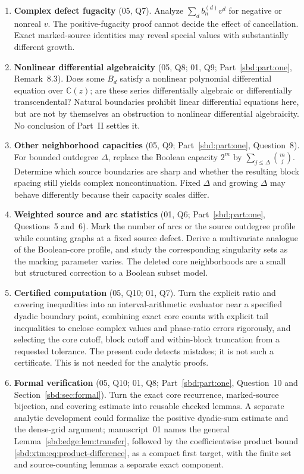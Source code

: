 \documentclass[11pt,a4paper]{article}
\theoremstyle{definition}
\newcommand{\C}{\mathbb C}
\begin{document}
\begin{enumerate}[label=\textbf{\arabic*.},leftmargin=*]
\item \textbf{Complex defect fugacity} (05, Q7). Analyze
$\sum_db_n^{(d)}v^d$ for negative or nonreal $v$. The positive-fugacity
proof cannot decide the effect of cancellation. Exact marked-source
identities may reveal special values with substantially different growth.

\item \textbf{Nonlinear differential algebraicity} (05, Q8; 01, Q9;
Part~\ref{sbd:part:one}, Remark~8.3). Does some $B_d$ satisfy a nonlinear
polynomial differential equation over $\C(z)$; are these series
differentially algebraic or differentially transcendental? Natural
boundaries prohibit linear differential equations here, but are not by
themselves an obstruction to nonlinear differential algebraicity. No
conclusion of Part~II settles it.

\item \textbf{Other neighborhood capacities} (05, Q9;
Part~\ref{sbd:part:one}, Question~8). For bounded outdegree $\Delta$,
replace the Boolean capacity $2^m$ by $\sum_{j\le\Delta}\binom mj$.
Determine which source boundaries are sharp and whether the resulting block
spacing still yields complex noncontinuation. Fixed $\Delta$ and growing
$\Delta$ may behave differently because their capacity scales differ.

\item \textbf{Weighted source and arc statistics} (01, Q6;
Part~\ref{sbd:part:one}, Questions~5 and~6). Mark the number of arcs or the
source outdegree profile while counting graphs at a fixed source defect.
Derive a multivariate analogue of the Boolean-core profile, and study the
corresponding singularity sets as the marking parameter varies. The deleted
core neighborhoods are a small but structured correction to a Boolean
subset model.

\item \textbf{Certified computation} (05, Q10; 01, Q7). Turn the explicit
ratio and covering inequalities into an interval-arithmetic evaluator near
a specified dyadic boundary point, combining exact core counts with
explicit tail inequalities to enclose complex values and phase-ratio errors
rigorously, and selecting the core cutoff, block cutoff and within-block
truncation from a requested tolerance. The present code detects mistakes;
it is not such a certificate. This is not needed for the analytic proofs.

\item \textbf{Formal verification} (05, Q10; 01, Q8; Part~\ref{sbd:part:one},
Question~10 and Section~\ref{sbd:sec:formal}). Turn the exact core
recurrence, marked-source bijection, and covering estimate into reusable
checked lemmas. A separate analytic development could formalize the
positive dyadic-sum estimate and the dense-grid argument; manuscript~01
names the general Lemma~\ref{sbd:edge:lem:transfer}, followed by the
coefficientwise product bound \eqref{sbd:xtm:eq:product-difference}, as a
compact first target, with the finite set and source-counting lemmas a
separate exact component.


\end{enumerate}
\end{document}
